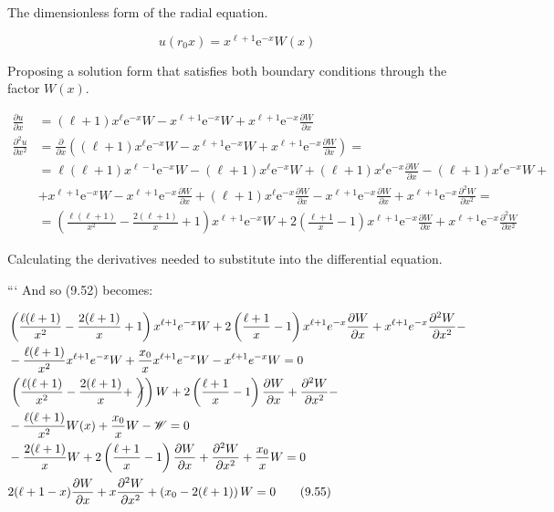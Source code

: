\documentclass[10pt]{article}
\begin{document}
The dimensionless form of the radial equation.

\begin{equation*}
u\left(r_{0} x\right)=x^{\ell+1} \mathrm{e}^{-x} W(x) \tag{9.53}
\end{equation*}

Proposing a solution form that satisfies both boundary conditions through the factor $W(x)$.

\begin{align*}
\frac{\partial u}{\partial x} & =(\ell+1) x^{\ell} \mathrm{e}^{-x} W-x^{\ell+1} \mathrm{e}^{-x} W+x^{\ell+1} \mathrm{e}^{-x} \frac{\partial W}{\partial x} \\
\frac{\partial^{2} u}{\partial x^{2}} & =\frac{\partial}{\partial x}\left((\ell+1) x^{\ell} \mathrm{e}^{-x} W-x^{\ell+1} \mathrm{e}^{-x} W+x^{\ell+1} \mathrm{e}^{-x} \frac{\partial W}{\partial x}\right)= \\
& =\ell(\ell+1) x^{\ell-1} \mathrm{e}^{-x} W-(\ell+1) x^{\ell} \mathrm{e}^{-x} W+(\ell+1) x^{\ell} \mathrm{e}^{-x} \frac{\partial W}{\partial x}-(\ell+1) x^{\ell} \mathrm{e}^{-x} W+ \\
& +x^{\ell+1} \mathrm{e}^{-x} W-x^{\ell+1} \mathrm{e}^{-x} \frac{\partial W}{\partial x}+(\ell+1) x^{\ell} \mathrm{e}^{-x} \frac{\partial W}{\partial x}-x^{\ell+1} \mathrm{e}^{-x} \frac{\partial W}{\partial x}+x^{\ell+1} \mathrm{e}^{-x} \frac{\partial^{2} W}{\partial x^{2}}= \\
& =\left(\frac{\ell(\ell+1)}{x^{2}}-\frac{2(\ell+1)}{x}+1\right) x^{\ell+1} \mathrm{e}^{-x} W+2\left(\frac{\ell+1}{x}-1\right) x^{\ell+1} \mathrm{e}^{-x} \frac{\partial W}{\partial x}+x^{\ell+1} \mathrm{e}^{-x} \frac{\partial^{2} W}{\partial x^{2}} \tag{9.54}
\end{align*}

Calculating the derivatives needed to substitute into the differential equation.

```
And so (9.52) becomes:

\begin{align*}
& \left(\frac{\ell(\ell+1)}{x^{2}}-\frac{2(\ell+1)}{x}+1\right) x^{\ell+1} e^{-x} W+2\left(\frac{\ell+1}{x}-1\right) x^{\ell+1} e^{-x} \frac{\partial W}{\partial x}+x^{\ell+1} e^{-x} \frac{\partial^{2} W}{\partial x^{2}}- \\
& -\frac{\ell(\ell+1)}{x^{2}} x^{\ell+1} e^{-x} W+\frac{x_{0}}{x} x^{\ell+1} e^{-x} W-x^{\ell+1} e^{-x} W=0 \\
& \left.\left(\frac{\ell(\ell+1)}{x^{2}}-\frac{2(\ell+1)}{x}+\not\right)\right) W+2\left(\frac{\ell+1}{x}-1\right) \frac{\partial W}{\partial x}+\frac{\partial^{2} W}{\partial x^{2}}- \\
& -\frac{\ell(\ell+1)}{x^{2}} W(x)+\frac{x_{0}}{x} W-\mathscr{W}=0 \\
& -\frac{2(\ell+1)}{x} W+2\left(\frac{\ell+1}{x}-1\right) \frac{\partial W}{\partial x}+\frac{\partial^{2} W}{\partial x^{2}}+\frac{x_{0}}{x} W=0 \\
& 2(\ell+1-x) \frac{\partial W}{\partial x}+x \frac{\partial^{2} W}{\partial x^{2}}+\left(x_{0}-2(\ell+1)\right) W=0 \tag{9.55}
\end{align*}
\end{document}
